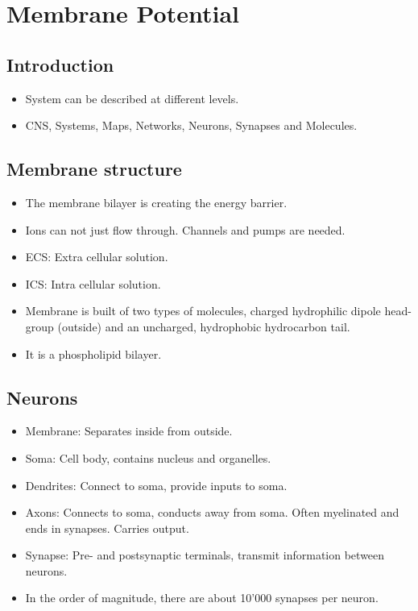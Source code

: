 \documentclass[a4paper, 12pt]{article}
\begin{document}
\section{Membrane Potential}
\subsection{Introduction}
\begin{itemize}[noitemsep,nolistsep]
	\item System can be described at different levels.
	\item CNS, Systems, Maps, Networks, Neurons, Synapses and Molecules.
\end{itemize}

\subsection{Membrane structure}
\begin{itemize}[noitemsep,nolistsep]
	\item The membrane bilayer is creating the energy barrier.
	\item Ions can not just flow through. Channels and pumps are needed.
	\item ECS: Extra cellular solution.
	\item ICS: Intra cellular solution.
	\item Membrane is built of two types of molecules, charged hydrophilic dipole head-group (outside) and an uncharged, hydrophobic hydrocarbon tail.
	\item It is a phospholipid bilayer.
\end{itemize}

\subsection{Neurons}
\begin{itemize}[noitemsep,nolistsep]
	\item Membrane: Separates inside from outside.
	\item Soma: Cell body, contains nucleus and organelles.
	\item Dendrites: Connect to soma, provide inputs to soma.
	\item Axons: Connects to soma, conducts away from soma. Often myelinated and ends in synapses. Carries output.
	\item Synapse: Pre- and postsynaptic terminals, transmit information between neurons.
	\item In the order of magnitude, there are about 10'000 synapses per neuron.
\end{itemize}
\end{document}
